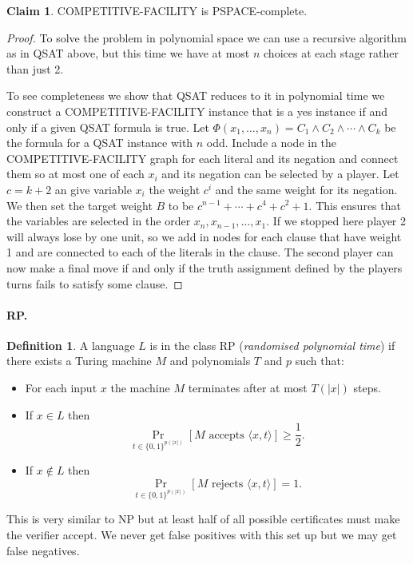 \documentclass[11pt,a4paper]{article}
\theoremstyle{definition}
\newtheorem{claim}{Claim}
\newtheorem{defn}{Definition}
\begin{document}
\begin{claim}
COMPETITIVE-FACILITY is PSPACE-complete.
\end{claim}
\begin{proof}
To solve the problem in polynomial space we can use a recursive algorithm as in QSAT above, but this time we have at most $n$ choices at each stage rather than just 2.

To see completeness we show that QSAT reduces to it in polynomial time we construct a COMPETITIVE-FACILITY instance that is a yes instance if and only if a given QSAT formula is true.
Let $\Phi(x_1,\ldots,x_n) = C_1 \wedge C_2 \wedge \cdots \wedge C_k$ be the formula for a QSAT instance with $n$ odd.
Include a node in the COMPETITIVE-FACILITY graph for each literal and its negation and connect them so at most one of each $x_i$ and its negation can be selected by a player.
Let $c = k+2$ an give variable $x_i$ the weight $c^i$ and the same weight for its negation.
We then set the target weight $B$ to be $c^{n-1} + \cdots  + c^4 + c^2 + 1$.
This ensures that the variables are selected in the order $x_n, x_{n-1}, \ldots, x_1$.
If we stopped here player 2 will always lose by one unit, so we add in nodes for each clause that have weight 1 and are connected to each of the literals in the clause.
The second player can now make a final move if and only if the truth assignment defined by the players turns fails to satisfy some clause.
\end{proof}



\paragraph{RP.}
\begin{defn}
A language $L$ is in the class RP (\emph{randomised polynomial time}) if there exists a Turing machine $M$ and polynomials $T$ and $p$ such that:
\begin{itemize}
\item
For each input $x$ the machine $M$ terminates after at most $T(|x|)$ steps.
\item
If $x\in L$ then \[\Pr_{t\in \{0,1\}^{p(|x|)}}[M \text{ accepts } \langle x, t\rangle] \ge \frac{1}{2}.\]
\item
If $x\not\in L$ then \[\Pr_{t\in \{0,1\}^{p(|x|)}}[M \text{ rejects } \langle x, t\rangle] = 1.\]
\end{itemize}
\end{defn}
This is very similar to NP but at least half of all possible certificates must make the verifier accept.
We never get false positives with this set up but we may get false negatives.
\end{document}

